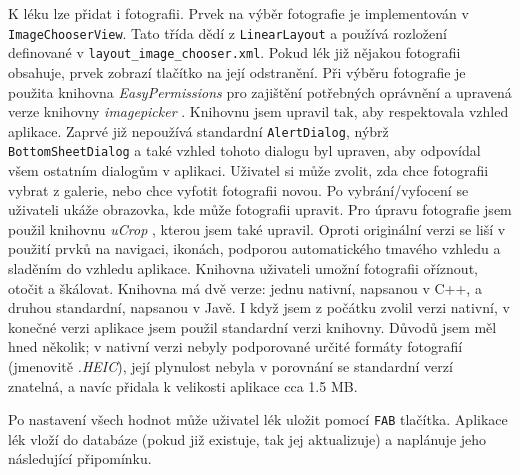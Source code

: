 \documentclass[../TakeYourPill.tex]{subfiles}
\begin{document}
K léku lze přidat i fotografii. Prvek na výběr fotografie je implementován v \texttt{ImageChooserView}. Tato třída dědí z \texttt{LinearLayout} a používá rozložení definované v \texttt{layout\_image\_chooser.xml}. Pokud lék již nějakou fotografii obsahuje, prvek zobrazí tlačítko na její odstranění. Při výběru fotografie je použita knihovna \textit{EasyPermissions} \cite{easy-permissions} pro zajištění potřebných oprávnění a upravená verze knihovny \textit{imagepicker} \cite{imagepicker}. Knihovnu jsem upravil tak, aby respektovala vzhled aplikace. Zaprvé již nepoužívá standardní \texttt{AlertDialog}, nýbrž \texttt{BottomSheetDialog} a také vzhled tohoto dialogu byl upraven, aby odpovídal všem ostatním dialogům v aplikaci. Uživatel si může zvolit, zda chce fotografii vybrat z galerie, nebo chce vyfotit fotografii novou. Po vybrání/vyfocení se uživateli ukáže obrazovka, kde může fotografii upravit. Pro úpravu fotografie jsem použil knihovnu \textit{uCrop} \cite{ucrop}, kterou jsem také upravil. Oproti originální verzi se liší v použití prvků na navigaci, ikonách, podporou automatického tmavého vzhledu a sladěním do vzhledu aplikace. Knihovna uživateli umožní fotografii oříznout, otočit a škálovat. Knihovna má dvě verze: jednu nativní, napsanou v C++, a druhou standardní, napsanou v Javě. I když jsem z počátku zvolil verzi nativní, v konečné verzi aplikace jsem použil standardní verzi knihovny. Důvodů jsem měl hned několik; v nativní verzi nebyly podporované určité formáty fotografií (jmenovitě \textit{.HEIC}), její plynulost nebyla v porovnání se standardní verzí znatelná, a navíc přidala k velikosti aplikace cca 1.5 MB.

Po nastavení všech hodnot může uživatel lék uložit pomocí \texttt{FAB} tlačítka. Aplikace lék vloží do databáze (pokud již existuje, tak jej aktualizuje) a naplánuje jeho následující připomínku.

\end{document}
